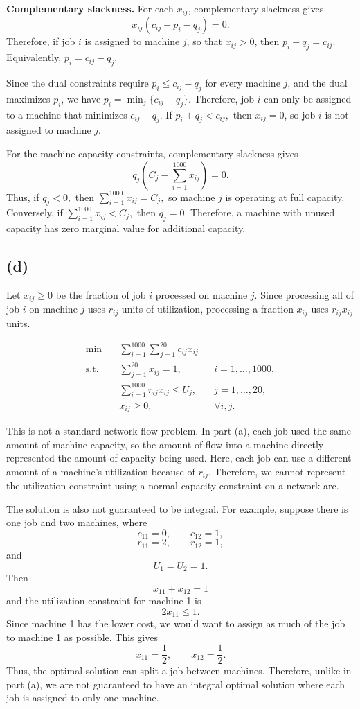 \documentclass{article}
\begin{document}
\textbf{Complementary slackness.} For each $x_{ij}$, complementary slackness gives
\[
x_{ij}\left(c_{ij}-p_i-q_j\right)=0.
\]
Therefore, if job $i$ is assigned to machine $j$, so that $x_{ij}>0$,
then
$
p_i+q_j=c_{ij}.
$
Equivalently,
$
p_i=c_{ij}-q_j.
$


Since the dual constraints require
$
p_i\leq c_{ij}-q_j
$ for every machine $j$, and the dual maximizes $p_i$, we have
$
p_i=\min_j\{c_{ij}-q_j\}.
$
Therefore, job $i$ can only be assigned to a machine that minimizes
$c_{ij}-q_j$. If
$
p_i+q_j<c_{ij},
$
then $x_{ij}=0$, so job $i$ is not assigned to machine $j$.

For the machine capacity constraints, complementary slackness gives
\[
q_j\left(C_j-\sum_{i=1}^{1000}x_{ij}\right)=0.
\]
Thus, if
$
q_j<0,$
then
$
\sum_{i=1}^{1000}x_{ij}=C_j,
$
so machine $j$ is operating at full capacity. Conversely, if
$
\sum_{i=1}^{1000}x_{ij}<C_j,
$
then $q_j=0$. Therefore, a machine with unused capacity has zero
marginal value for additional capacity.


\vspace{5mm}


\subsection*{(d)}

Let $x_{ij}\geq 0$ be the fraction of job $i$ processed on machine $j$.
Since processing all of job $i$ on machine $j$ uses $r_{ij}$ units of
utilization, processing a fraction $x_{ij}$ uses $r_{ij}x_{ij}$ units.

\[
\begin{aligned}
\min \quad
& \sum_{i=1}^{1000}\sum_{j=1}^{20} c_{ij}x_{ij} \\
\text{s.t.}\quad
& \sum_{j=1}^{20}x_{ij}=1,
&& i=1,\ldots,1000,\\
& \sum_{i=1}^{1000}r_{ij}x_{ij}\leq U_j,
&& j=1,\ldots,20,\\
& x_{ij}\geq0,
&& \forall i,j.
\end{aligned}
\]

This is not a standard network flow problem. In part (a), each job used
the same amount of machine capacity, so the amount of flow into a machine
directly represented the amount of capacity being used. Here, each job
can use a different amount of a machine's utilization because of
$r_{ij}$. Therefore, we cannot represent the utilization constraint using
a normal capacity constraint on a network arc.

The solution is also not guaranteed to be integral. For example, suppose
there is one job and two machines, where
\[
c_{11}=0,\qquad c_{12}=1,
\]
\[
r_{11}=2,\qquad r_{12}=1,
\]
and
\[
U_1=U_2=1.
\]
Then
\[
x_{11}+x_{12}=1
\]
and the utilization constraint for machine 1 is
\[
2x_{11}\leq 1.
\]
Since machine 1 has the lower cost, we would want to assign as much of
the job to machine 1 as possible. This gives
\[
x_{11}=\frac{1}{2},\qquad x_{12}=\frac{1}{2}.
\]
Thus, the optimal solution can split a job between machines. Therefore,
unlike in part (a), we are not guaranteed to have an integral optimal
solution where each job is assigned to only one machine.
\end{document}
